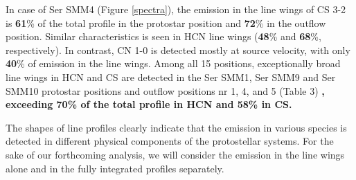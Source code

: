 \documentclass{aa}
\begin{document}
In case of Ser SMM4 (Figure \ref{spectra}), the emission in the line wings
of CS 3-2 is \textbf{61}\% of the total profile 
in the protostar position and \textbf{72}\% in the outflow position. Similar characteristics is 
seen in HCN line wings (\textbf{48}\% and \textbf{68}\%, respectively). In contrast, CN 1-0 is detected 
mostly at source velocity, with only \textbf{40}\% of emission in the line wings. Among all 15
positions, exceptionally broad line wings in HCN and CS are detected in 
the Ser SMM1, Ser SMM9 and Ser SMM10 protostar positions and outflow positions 
nr 1, 4, and 5 (Table 3) \textbf{, exceeding 70\% of the total profile in HCN and 58\% in CS.} 

The shapes of line profiles clearly indicate that the emission in various species is 
detected in different physical components of the protostellar systems. For the sake 
of our forthcoming analysis, we will consider the emission in the line wings alone and in 
the fully integrated profiles separately.

\end{document}
